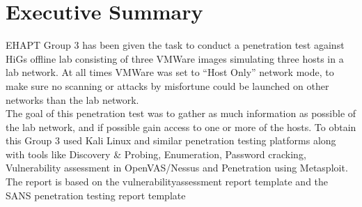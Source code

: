 \section{Executive Summary}

EHAPT Group 3 has been given the task to conduct a penetration test against HiGs offline lab consisting of three VMWare images simulating three hosts in a lab network. At all times VMWare was set to “Host Only” network mode, to make sure no scanning or attacks by misfortune could be launched on other networks than the lab network.\\
The goal of this penetration test was to gather as much information as possible of the lab network, and if possible gain access to one or more of the hosts. To obtain this Group 3 used Kali Linux and similar penetration testing platforms along with tools like Discovery \& Probing, Enumeration, Password cracking, Vulnerability assessment in OpenVAS/Nessus and Penetration using Metasploit.\\
The report is based on the vulnerabilityassessment report template \cite{reporttemplate} and the SANS penetration testing report template \cite{sans}
